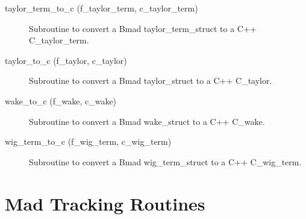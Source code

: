 \begin{description}
\item[taylor\_term\_to\_c (f\_taylor\_term, c\_taylor\_term)] \Newline 
Subroutine to convert a Bmad taylor\_term\_struct to a C++ C\_taylor\_term.

\item[taylor\_to\_c (f\_taylor, c\_taylor)] \Newline 
Subroutine to convert a Bmad taylor\_struct to a C++ C\_taylor.

\item[wake\_to\_c (f\_wake, c\_wake)] \Newline 
Subroutine to convert a Bmad wake\_struct to a C++ C\_wake.

\item[wig\_term\_to\_c (f\_wig\_term, c\_wig\_term)] \Newline 
Subroutine to convert a Bmad wig\_term\_struct to a C++ C\_wig\_term.

\end{description}

\section{Mad Tracking Routines}
\label{r:mad}      

